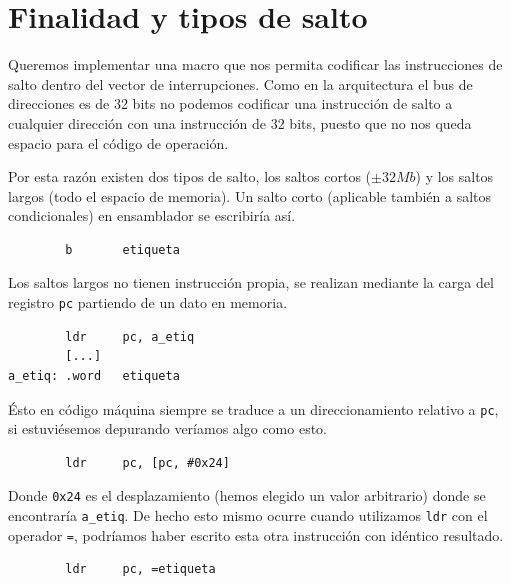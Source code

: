 \pagestyle{fancy}
\fancyhead[LE,RO]{\thepage}
\fancyhead[LO]{\nouppercase{\rightmark}}

\label{chp:MacroADDEXC}
\minitoc

\section{Finalidad y tipos de salto}

Queremos implementar una macro que nos permita codificar las
instrucciones de salto dentro del vector de interrupciones. Como en
la arquitectura el bus de direcciones es de 32 bits no podemos
codificar una instrucción de salto a cualquier dirección con
una instrucción de 32 bits, puesto que no nos queda espacio
para el código de operación.

Por esta razón existen dos tipos de salto, los saltos cortos
($\pm 32Mb$) y los saltos largos (todo el espacio de memoria). Un
salto corto (aplicable también a saltos condicionales) en
ensamblador se escribiría así.

\begin{lstlisting}
        b       etiqueta
\end{lstlisting}

Los saltos largos no tienen instrucción propia, se realizan mediante
la carga del registro {\tt pc} partiendo de un dato en memoria.

\begin{lstlisting}
        ldr     pc, a_etiq
        [...]
a_etiq: .word   etiqueta
\end{lstlisting}

Ésto en código máquina siempre se traduce a un direccionamiento
relativo a {\tt pc}, si estuviésemos depurando veríamos algo como
esto.

\begin{lstlisting}
        ldr     pc, [pc, #0x24]
\end{lstlisting}

Donde {\tt 0x24} es el desplazamiento (hemos elegido un valor arbitrario)
donde se encontraría {\tt a\_etiq}. De hecho esto mismo ocurre cuando utilizamos
{\tt ldr} con el operador {\tt =}, podríamos haber escrito esta otra instrucción
con idéntico resultado.

\begin{lstlisting}
        ldr     pc, =etiqueta
\end{lstlisting}

